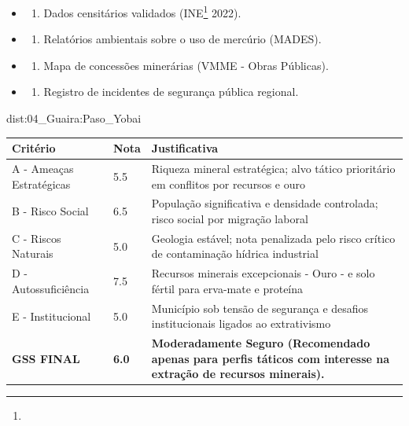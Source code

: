 {\begin{itemize}
\tightlist
\item
  \begin{enumerate}
  \def\labelenumi{\arabic{enumi})}
  \tightlist
  \item
    Dados censitários validados (INE\footnote{\fineINE} 2022).
  \end{enumerate}
\item
  \begin{enumerate}
  \def\labelenumi{\arabic{enumi})}
  \setcounter{enumi}{1}
  \tightlist
  \item
    Relatórios ambientais sobre o uso de mercúrio (MADES).
  \end{enumerate}
\item
  \begin{enumerate}
  \def\labelenumi{\arabic{enumi})}
  \setcounter{enumi}{2}
  \tightlist
  \item
    Mapa de concessões minerárias (VMME - Obras Públicas).
  \end{enumerate}
\item
  \begin{enumerate}
  \def\labelenumi{\arabic{enumi})}
  \setcounter{enumi}{3}
  \tightlist
  \item
    Registro de incidentes de segurança pública regional.
  \end{enumerate}
\end{itemize}}{dist:04_Guaira:Paso_Yobai}
\begin{table}[ht!]
\small \begin{tabular}{p{3.0cm}p{0.8cm}p{6.0cm}} \toprule
\textbf{Critério} & \textbf{Nota} & \textbf{Justificativa} \\ \midrule
A - Ameaças Estratégicas & 5.5 & Riqueza mineral estratégica; alvo tático prioritário em conflitos por recursos e ouro \\
B - Risco Social & 6.5 & População significativa e densidade controlada; risco social por migração laboral \\
C - Riscos Naturais & 5.0 & Geologia estável; nota penalizada pelo risco crítico de contaminação hídrica industrial \\
D - Autossuficiência & 7.5 & Recursos minerais excepcionais - Ouro - e solo fértil para erva-mate e proteína \\
E - Institucional & 5.0 & Município sob tensão de segurança e desafios institucionais ligados ao extrativismo \\
\midrule \textbf{GSS FINAL} & \textbf{6.0} & \textbf{Moderadamente Seguro (Recomendado apenas para perfis táticos com interesse na extração de recursos minerais).} \\ \bottomrule \end{tabular}
\end{table}

